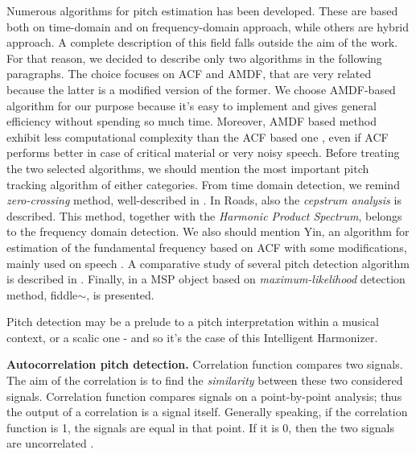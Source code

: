 Numerous algorithms for pitch estimation has been developed. These are based both on time-domain and on frequency-domain approach, while others are hybrid approach. A complete description of this field falls outside the aim of the work. For that reason, we decided to describe only two algorithms in the following paragraphs. The choice focuses on ACF and AMDF, that are very related because the latter is a modified version of the former. We choose AMDF-based algorithm for our purpose because it's easy to implement and gives general efficiency without spending so much time. Moreover, AMDF based method exhibit less computational complexity than the ACF based one \cite{abdullah2009high}, even if ACF performs better in case of critical material or very noisy speech. 
\newline
Before treating the two selected algorithms, we should mention the most important pitch tracking algorithm of either categories. From time domain detection, we remind \emph{zero-crossing} method, well-described in \cite{roads1996tutorial}. In Roads, also the \emph{cepstrum analysis} is described. This method, together with the \emph{Harmonic Product Spectrum}, belongs to the frequency domain detection. We also should mention Yin, an algorithm for estimation of the fundamental frequency based on ACF with some modifications, mainly used on speech \cite{de2002yin}. A comparative study of several pitch detection algorithm is described in \cite{rabiner1976comparative}. Finally, in \cite{puckette1998real} a MSP object based on \emph{maximum-likelihood} detection method, fiddle$\sim$, is presented.

Pitch detection may be a prelude to a pitch interpretation within a musical context, or a scalic one - and so it's the case of this Intelligent Harmonizer.

\textbf{Autocorrelation pitch detection.}
Correlation function compares two signals. The aim of the correlation is to find the \emph{similarity} between these two considered signals. Correlation function compares signals on a point-by-point analysis; thus the output of a correlation is a signal itself. Generally speaking, if the correlation function is 1, the signals are equal in that point. If it is 0, then the two signals are uncorrelated \cite{roads1996tutorial}. 

